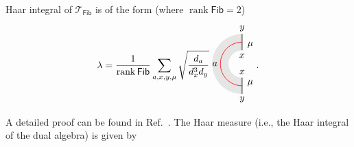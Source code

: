 \documentclass[a4paper,11pt]{article}
\theoremstyle{theorem}
\theoremstyle{remark}
\newcommand{\Fib}{\mathsf{Fib}}
\begin{document}
Haar integral of $\mathcal{T}_{\mathsf{Fib}}$ is of the form (where $\operatorname{rank} \Fib =2$)
\begin{equation}\label{eq:HaarTube}
    \lambda = \frac{1}{\operatorname{rank} \mathsf{Fib}} \sum_{a,x,y,\mu} 
    \sqrt{\frac{d_a}{d_x^3 d_y}}
        \begin{aligned}
    \begin{tikzpicture}
        \begin{scope}
            \fill[gray!20]
                (0,1.1) arc[start angle=90, end angle=270, radius=1.1] -- 
                (0,-0.5) arc[start angle=270, end angle=90, radius=0.5] -- cycle;
        \end{scope}
           \draw[line width=0.6pt,black] (0,0.5)--(0,1.1);
        \draw[line width=.6pt,black] (0,-0.5)--(0,-1.1);
        \draw[red, line width=0.6pt] (0,0.8) arc[start angle=90, end angle=270, radius=0.8];
        \node[line width=0.6pt, dashed, draw opacity=0.5] at (0,1.3) {$y$};
        \node[line width=0.6pt, dashed, draw opacity=0.5] at (0,-1.3) {$y$};
        \node[line width=0.6pt, dashed, draw opacity=0.5] at (-1,0) {$a$};
        \node[line width=0.6pt, dashed, draw opacity=0.5] at (0.3,-0.7) {$\mu$};
        \node[line width=0.6pt, dashed, draw opacity=0.5] at (0,-0.3) {$x$};
        \node[line width=0.6pt, dashed, draw opacity=0.5] at (0,0.3) {$x$};
        \node[line width=0.6pt, dashed, draw opacity=0.5] at (0.3,0.7) {$\mu$};
    \end{tikzpicture}
\end{aligned}.
\end{equation}
A detailed proof can be found in Ref.~\cite{jia2025weakhopftubealgebra}. 
The Haar measure (i.e., the Haar integral of the dual algebra) is given by
\end{document}

